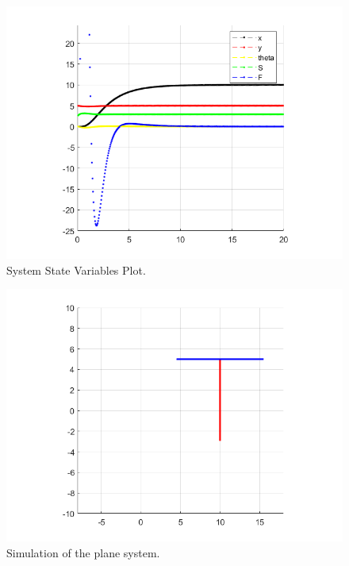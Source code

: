 \documentclass{article}
\begin{document}
\begin{itemize}
\bigskip
\begin{figure}[H]
\centerline{\includegraphics[scale=0.65]{figures/p2_7graphic}}
\caption{System State Variables Plot.}
\label{fig:figure2}
\end{figure}

\begin{figure}[H]
\centerline{\includegraphics[scale=0.65]{figures/p2_7simulation}}
\caption{Simulation of the plane system.}
\label{fig:figure2}
\end{figure}
\bigskip

\end{itemize}
\end{document}
